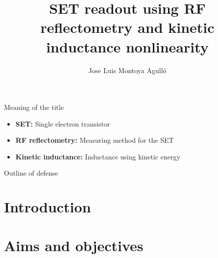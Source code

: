 \documentclass{beamer}
\title{
\textbf{SET readout using RF reflectometry and kinetic inductance nonlinearity}
}
\author{Jose Luis Montoya Agull\'o}
\date{}
\numberwithin{equation}{section}
\begin{document}
\begin{frame}
    \maketitle
\end{frame}

%
%

\begin{frame}{Meaning of the title}
\begin{itemize}
    \item \textbf{SET:} Single electron transistor
    \item \textbf{RF reflectometry:} Measuring method for the SET
    \item \textbf{Kinetic inductance:} Inductance using kinetic energy
\end{itemize}
\end{frame}

\begin{frame}{Outline of defense}
\setcounter{tocdepth}{1}
\tableofcontents{}
\setcounter{tocdepth}{3}
\end{frame}

%
\section{Introduction}
\label{sec:Intro}


\section{Aims and objectives}
\label{sec:Objectives}

\end{document}
